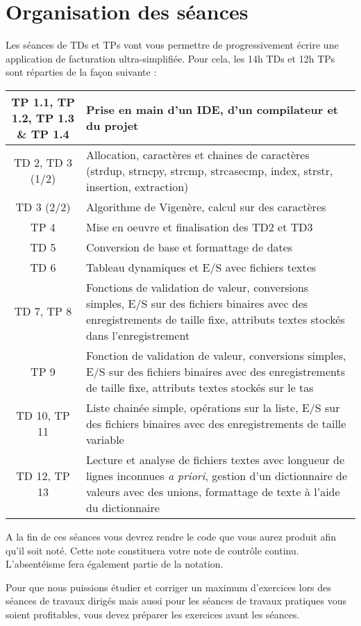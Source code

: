 \chapter{Organisation des séances}

Les séances de TDs et TPs vont vous permettre de progressivement écrire une
application de facturation ultra-simplifiée. Pour cela, les 14h TDs et 12h TPs
sont réparties de la façon suivante :

{\tabulinesep=1.2mm
\begin{tabu}[c]{|c|X|}
\hline
  TP 1.1, TP 1.2, TP 1.3 \& TP 1.4& Prise en main d'un IDE, d'un compilateur et du projet\\
\hline
  TD 2, TD 3 (1/2)& Allocation, caractères et chaines de caractères (strdup, strncpy, strcmp, strcasecmp, index, strstr, insertion, extraction)\\
\hline
  TD 3 (2/2)& Algorithme de Vigenère, calcul sur des caractères\\
\hline
  TP 4& Mise en oeuvre et finalisation des TD2 et TD3\\
\hline
  TD 5& Conversion de base et formattage de dates\\
\hline
  TD 6& Tableau dynamiques et E/S avec fichiers textes\\
\hline
  TD 7, TP 8& Fonctions de validation de valeur, conversions simples, E/S sur des fichiers binaires avec des enregistrements de taille fixe, attributs textes stockés dans l'enregistrement\\
\hline
  TP 9& Fonction de validation de valeur, conversions simples, E/S sur des fichiers binaires avec des enregistrements de taille fixe, attributs textes stockés sur le tas\\\hline 
  TD 10, TP 11& Liste chainée simple, opérations sur la liste, E/S sur des fichiers binaires avec des enregistrements de taille variable\\
\hline
  TD 12, TP 13& Lecture et analyse de fichiers textes avec longueur de lignes inconnues \textit{a priori}, gestion d'un dictionnaire de valeurs avec des unions, formattage de texte à l'aide du dictionnaire\\
\hline
\end{tabu}}


A la fin de ces séances vous devrez rendre le code que vous aurez produit afin
qu'il soit noté. Cette note constituera votre note de contrôle continu.
L'absentéisme fera également partie de la notation.

\begin{warning}
Pour que nous puissions étudier et corriger un maximum d'exercices lors des séances de travaux dirigés mais aussi pour les séances de travaux pratiques vous soient profitables, vous devez préparer les exercices avant les séances.
\end{warning}